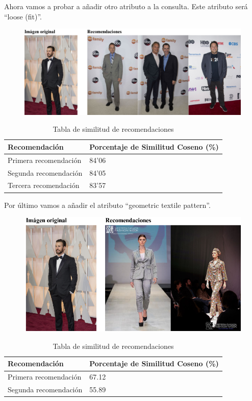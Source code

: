 \documentclass[12pt]{report} %
\begin{document}
	Ahora vamos a probar a añadir otro atributo a la consulta. Este atributo será ``loose (fit)''.
	\begin{figure}[H]
		{\includegraphics[scale=0.6]{atributos2.png}}
	\end{figure}
	\begin{table}[H]
		\centering
		\caption{Tabla de similitud de recomendaciones}
		\begin{tabular}{ll}
				\textbf{Recomendación} & \textbf{Porcentaje de Similitud Coseno (\%)} \\
				\midrule
				Primera recomendación & 84'06 \\
				Segunda recomendación & 84'05 \\
				Tercera recomendación & 83'57 \\
				\bottomrule
		\end{tabular}
	\end{table}

	Por último vamos a añadir el atributo ``geometric textile pattern''.

		\begin{figure}[H]
		{\includegraphics[scale=0.8]{atributos3.png}}
	\end{figure}
	\begin{table}[H]
		\centering
		\caption{Tabla de similitud de recomendaciones}
		\begin{tabular}{ll}
				\textbf{Recomendación} & \textbf{Porcentaje de Similitud Coseno (\%)} \\
				\midrule
				Primera recomendación & 67.12 \\
				Segunda recomendación & 55.89 \\
				\bottomrule
		\end{tabular}
	\end{table}
\end{document}
